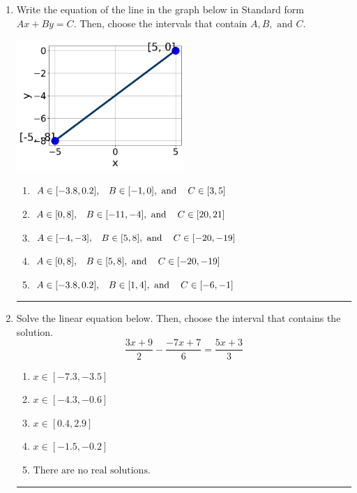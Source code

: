 \documentclass[14pt]{extbook}
\newcommand{\litem}[1]{\item#1\hspace*{-1cm}\rule{\textwidth}{0.4pt}}
\begin{document}
\begin{enumerate}
\litem{
Write the equation of the line in the graph below in Standard form $Ax+By=C$. Then, choose the intervals that contain $A, B, \text{ and } C$.
\begin{center}
    \includegraphics[width=0.5\textwidth]{../Figures/linearGraphToStandardCopyC.png}
\end{center}
\begin{enumerate}[label=\Alph*.]
\item \( A \in [-3.8, 0.2], \hspace{3mm} B \in [-1, 0], \text{ and } \hspace{3mm} C \in [3, 5] \)
\item \( A \in [0, 8], \hspace{3mm} B \in [-11, -4], \text{ and } \hspace{3mm} C \in [20, 21] \)
\item \( A \in [-4, -3], \hspace{3mm} B \in [5, 8], \text{ and } \hspace{3mm} C \in [-20, -19] \)
\item \( A \in [0, 8], \hspace{3mm} B \in [5, 8], \text{ and } \hspace{3mm} C \in [-20, -19] \)
\item \( A \in [-3.8, 0.2], \hspace{3mm} B \in [1, 4], \text{ and } \hspace{3mm} C \in [-6, -1] \)

\end{enumerate} }
\litem{
Solve the linear equation below. Then, choose the interval that contains the solution.\[ \frac{3x + 9}{2} - \frac{-7x + 7}{6} = \frac{5x + 3}{3} \]\begin{enumerate}[label=\Alph*.]
\item \( x \in [-7.3, -3.5] \)
\item \( x \in [-4.3, -0.6] \)
\item \( x \in [0.4, 2.9] \)
\item \( x \in [-1.5, -0.2] \)
\item \( \text{There are no real solutions.} \)


\end{enumerate}}
\end{enumerate}
\end{document}
